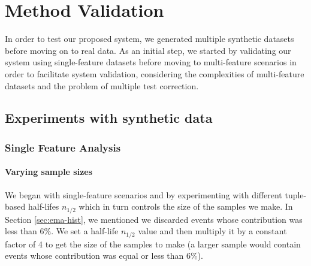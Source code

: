 \chapter{Method Validation} \label{chap:validation} \minitoc

In order to test our proposed system, we generated multiple synthetic datasets before moving on to real data. As an initial step, we started by validating our system using single-feature datasets before moving to multi-feature scenarios in order to facilitate system validation, considering the complexities of multi-feature datasets and the problem of multiple test correction.


\section{Experiments with synthetic data}
\subsection{Single Feature Analysis}

\subsubsection{Varying sample sizes}
We began with single-feature scenarios and by experimenting with different tuple-based half-lifes $n_{1/2}$ which in turn controls the size of the samples we make. In Section \ref{sec:ema-hist}, we mentioned we discarded events whose contribution was less than 6\%. We set a half-life $n_{1/2}$ value and then multiply it by a constant factor of 4 to get the size of the samples to make (a larger sample would contain events whose contribution was equal or less than 6\%).

